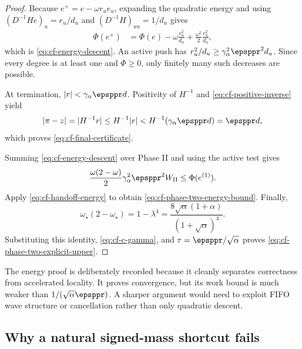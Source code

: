 \begin{proof}
Because \(e^+=e-\omega r_u e_u\), expanding the quadratic energy and using
\((D^{-1}He)_u=r_u/d_u\) and
\((D^{-1}H)_{uu}=1/d_u\) gives
\begin{align}
    \Phi(e^+)
    &=\Phi(e)
      -\omega\frac{r_u^2}{d_u}
      +\frac{\omega^2}{2}\frac{r_u^2}{d_u},
    \label{eq:cf-energy-expansion}
\end{align}
which is \cref{eq:cf-energy-descent}.  An active push has
\(r_u^2/d_u\geq\gamma_\alpha^2\epsppr^2d_u\).  Since every degree is at
least one and \(\Phi\geq0\), only finitely many such decreases are possible.

At termination, \(|r|<\gamma_\alpha\epsppr d\).  Positivity of \(H^{-1}\)
and \cref{eq:cf-positive-inverse} yield
\begin{equation}
    |\pi-z|
    =|H^{-1}r|
    \leq H^{-1}|r|
    <H^{-1}(\gamma_\alpha\epsppr d)
    =\epsppr d,
    \label{eq:cf-final-certificate-proof}
\end{equation}
which proves \cref{eq:cf-final-certificate}.

Summing \cref{eq:cf-energy-descent} over Phase II and using the active test
gives
\begin{equation}
    \frac{\omega(2-\omega)}2
       \gamma_\alpha^2\epsppr^2 W_{\rm II}
    \leq\Phi(e^{(1)}).
    \label{eq:cf-energy-work-sum}
\end{equation}
Apply \cref{eq:cf-handoff-energy} to obtain
\cref{eq:cf-phase-two-energy-bound}.  Finally,
\begin{equation}
    \omega_\star(2-\omega_\star)
    =1-\lambda^4
    =\frac{8\sqrt\alpha(1+\alpha)}{(1+\sqrt\alpha)^4}.
    \label{eq:cf-sor-delta}
\end{equation}
Substituting this identity, \cref{eq:cf-c-gamma}, and
\(\tau=\epsppr/\sqrt\alpha\) proves
\cref{eq:cf-phase-two-explicit-upper}.
\end{proof}

The energy proof is deliberately recorded because it cleanly separates
correctness from accelerated locality.  It proves convergence, but its work
bound is much weaker than \(1/(\sqrt\alpha\epsppr)\).  A sharper argument
would need to exploit FIFO wave structure or cancellation rather than only
quadratic descent.

\subsection{Why a natural signed-mass shortcut fails}
\label{subsec:cf-false-mass-lemma}

